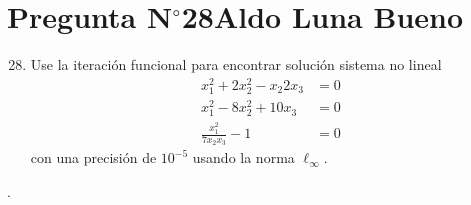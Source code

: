 \section{Pregunta N$^{\circ}$28\qquad Aldo Luna Bueno}

\begin{frame}
	\begin{enumerate}\setcounter{enumi}{27}
		\item

		      Use la iteración funcional para encontrar solución
		      sistema no lineal
		      \begin{align*}
			      x^{2}_{1}+2x^{2}_{2}-x_{2}2x_{3} & =0 \\
			      x^{2}_{1}-8x^2_{2}+10x_{3}       & =0 \\
			      \frac{x_{1}^{2}}{7x_{2}x_{3}}-1  & =0
		      \end{align*}
		      con una precisión de
		      $10^{-5}$ usando la norma $\ell_{\infty}$.
	\end{enumerate}

	\begin{solution}
		.
	\end{solution}
\end{frame}